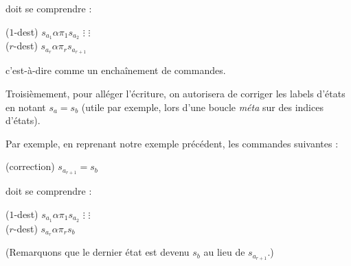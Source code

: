 \documentclass{report}
\begin{document}
\begin{appendices}
					\begin{algorithm}[H]
					\end{algorithm}
					
					\espace
					
					doit se comprendre :
					
					\espace
					
					\begin{algorithm}[H]
						($1$-dest) 	$s_{a_1} \alpha \pi_1 s_{a_{2}}$\;
						$\vdots$		\hspace{1cm} $\vdots$ \\
						($r$-dest) 	$s_{a_r} \alpha \pi_r s_{a_{r+1}}$\;
					\end{algorithm}
					
					\espace
					
					c'est-à-dire comme un enchaînement de commandes. 
					
					
					Troisièmement, pour alléger l'écriture, on autorisera de corriger les labels d'états en notant $s_a = s_b$ (utile par exemple, lors d'une boucle \emph{méta} sur des indices d'états).
					
					Par exemple, en reprenant notre exemple précédent, les commandes suivantes :
					
					\espace
					
					\begin{algorithm}[H]
						(correction)		$s_{a_{r+1}} = s_b$
					\end{algorithm}
					
					\espace
					
					doit se comprendre :
					
					\espace
					
					\begin{algorithm}[H]
						($1$-dest) 	$s_{a_1} \alpha \pi_1 s_{a_{2}}$\;
						$\vdots$		\hspace{1cm} $\vdots$ \\
						($r$-dest) 	$s_{a_r} \alpha \pi_r s_{b}$\;
					\end{algorithm}
					
					\espace
					
					(Remarquons que le dernier état est devenu $s_b$ au lieu de $s_{a_{r+1}}$.)
					
					
					\espace
					

\end{appendices}
\end{document}
